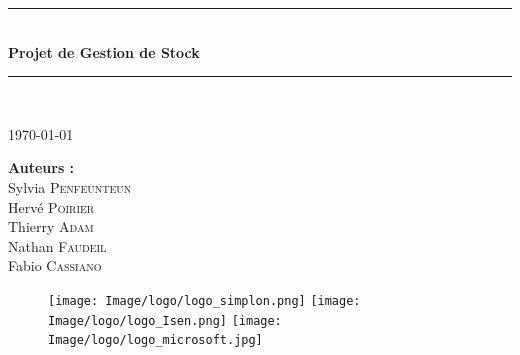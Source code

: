 \documentclass[french]{article}
\begin{document}
\begin{titlepage}

\newcommand{\HRule}{\rule{\linewidth}{0.5mm}} %

\center %
 
\HRule \\[0.4cm]
\vspace{1cm}
{ \huge \bfseries Projet de Gestion de Stock}\\ %
\vspace{1cm}
\HRule \\[1cm]
 
\vspace{1cm}

\Large \today

\vspace{3cm}

\begin{minipage}{0.4\textwidth}
\begin{center}
\Large \textbf{Auteurs :}\\
\vspace{0.5cm}
Sylvia \textsc{Penfeunteun} \\
Hervé \textsc{Poirier}\\
Thierry \textsc{Adam}\\
Nathan \textsc{Faudeil}\\
Fabio \textsc{Cassiano}
\end{center}
\end{minipage}

\vspace{5cm}

\begin{figure}[!ht]
	\texttt{[image: Image/logo/logo\_simplon.png]}
	\hspace*{0.5cm}
	\texttt{[image: Image/logo/logo\_Isen.png]}
	\hspace*{0.5cm}
	\texttt{[image: Image/logo/logo\_microsoft.jpg]}
\end{figure}

\vfill

\end{titlepage}
\end{document}

